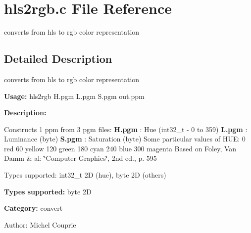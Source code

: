 \section{hls2rgb.c File Reference}
\label{hls2rgb_8c}
converts from hls to rgb color representation  




\label{_details}
\subsection{Detailed Description}
converts from hls to rgb color representation 

{\bf Usage:} hls2rgb H.pgm L.pgm S.pgm out.ppm

{\bf Description:}

Constructs 1 ppm from 3 pgm files: {\bf H.pgm} : Hue (int32\_\-t - 0 to 359) {\bf L.pgm} : Luminance (byte) {\bf S.pgm} : Saturation (byte) Some particular values of HUE: 0 red 60 yellow 120 green 180 cyan 240 blue 300 magenta Based on Foley, Van Damm \& al: \char`\"{}Computer Graphics\char`\"{}, 2nd ed., p. 595

Types supported: int32\_\-t 2D (hue), byte 2D (others)

{\bf Types supported:} byte 2D

{\bf Category:} convert

\begin{Desc}
\item[Author:]Michel Couprie \end{Desc}
